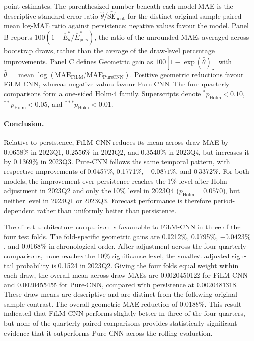 \begin{table}[htbp]
{point estimates. The
parenthesized number beneath each model MAE
is the descriptive standard-error ratio
$\widehat{\theta}/\widehat{\mathrm{SE}}_{\mathrm{boot}}$ for the distinct
original-sample paired mean log-MAE ratio against persistence; negative values
favour the model. Panel B reports
$100(1-\overline E_a^*/\overline E_{\mathrm{pers}}^*)$, the ratio of the
unrounded MAEs averaged across bootstrap draws, rather than the average of the
draw-level percentage improvements.
Panel C defines
Geometric gain as
$100[1-\exp(\widehat{\theta})]$ with $\widehat{\theta}=\operatorname{mean}\log(\mathrm{MAE}_{\mathrm{FiLM}}/
\mathrm{MAE}_{\mathrm{PureCNN}})$. Positive geometric reductions favour FiLM-CNN, whereas negative values favour Pure-CNN. The four quarterly comparisons form a one-sided Holm-4 family. Superscripts denote
$^{*}p_{\mathrm{Holm}}<0.10$,
$^{**}p_{\mathrm{Holm}}<0.05$, and
$^{***}p_{\mathrm{Holm}}<0.01$.}
\label{tab:ch3:direct_model_results}
\end{table}



\paragraph*{Conclusion.}
Relative to persistence, FiLM-CNN reduces its mean-across-draw MAE by 0.0658\% in
2023Q1, 0.2556\% in 2023Q2, and 0.3540\% in 2023Q4, but increases it by
0.1369\% in 2023Q3. Pure-CNN follows the same temporal pattern, with
respective improvements of 0.0457\%, 0.1771\%, $-0.0871\%$, and 0.3372\%. For both
models, the improvement over persistence reaches the 1\% level after
Holm adjustment in 2023Q2 and only the 10\% level in 2023Q4
($p_{\mathrm{Holm}}=0.0570$), but neither level in 2023Q1 or 2023Q3. Forecast
performance is therefore period-dependent rather than uniformly better than
persistence.

The direct architecture comparison is favourable to FiLM-CNN in three of the
four test folds. The fold-specific geometric gains are 0.0212\%, 0.0795\%,
$-0.0423\%$, and 0.0168\% in chronological order. After adjustment across
the four quarterly comparisons, none reaches the 10\% significance
level, the smallest adjusted sign-tail probability is 0.1524 in 2023Q2.
Giving the four folds equal weight within each draw, the overall
mean-across-draw MAEs are 0.0020450122 for FiLM-CNN and 0.0020455455 for
Pure-CNN, compared with persistence at 0.0020481318. These draw means are
descriptive and are distinct from the following original-sample contrast.
The overall geometric MAE reduction of 0.0188\%. This result indicated that FiLM-CNN performs slightly better in three of the four quarters, but none of the quarterly paired comparisons provides statistically significant evidence that it outperforms Pure-CNN across the rolling evaluation.


